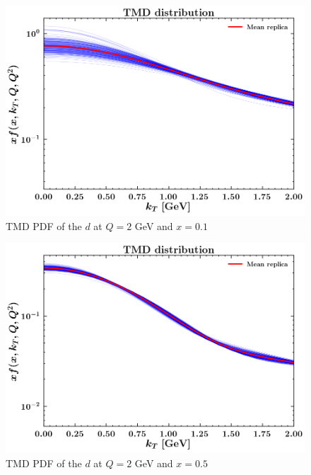 \documentclass[
]{article}
\begin{document}
\begin{figure}
\centering
\includegraphics{pngplots/tmd_1_2_0.1.png}
\caption{TMD PDF of the \(d\) at \(Q = 2\) GeV and \(x = 0.1\)}
\end{figure}

\begin{figure}
\centering
\includegraphics{pngplots/tmd_1_2_0.5.png}
\caption{TMD PDF of the \(d\) at \(Q = 2\) GeV and \(x = 0.5\)}
\end{figure}
\end{document}

